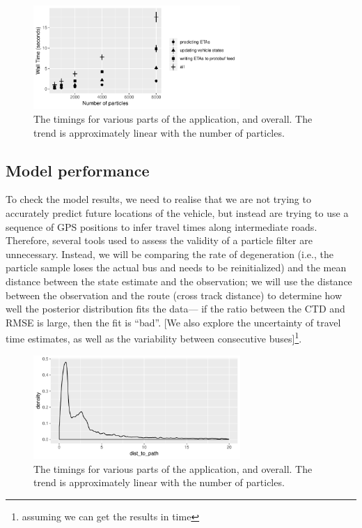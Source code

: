 \begin{figure}[tb]
    \centering
    \includegraphics[width=0.7\textwidth]{figures/04_model_results_timing.pdf}
    \caption{The timings for various parts of the application, and overall. %
        The trend is approximately linear with the number of particles.}
    \label{fig:timings}
\end{figure}




\subsection{Model performance}
\label{sec:model_perf}

To check the model results, 
we need to realise that we are not trying to accurately predict
future locations of the vehicle,
but instead are trying to use a sequence of GPS positions to infer travel
times along intermediate roads.
Therefore, several tools used to assess the validity of a particle filter
are unnecessary.
Instead, we will be comparing the rate of degeneration 
(i.e., the particle sample loses the actual bus and needs to be reinitialized)
and the mean distance between the state estimate and the observation; 
we will use the distance between the observation and the route (cross track distance) 
to determine how well the posterior distribution fits the data---%
if the ratio between the CTD and RMSE is large,
then the fit is ``bad''.
[We also explore the uncertainty of travel time estimates,
as well as the variability between consecutive buses]\footnote{assuming we can get the results in time}.

\begin{figure}[tb]
    \centering
    \includegraphics[width=0.7\textwidth]{figures/04_model_results_dist.pdf}
    \caption{The timings for various parts of the application, and overall. %
        The trend is approximately linear with the number of particles.}
    \label{fig:dist_to_route}
\end{figure}

